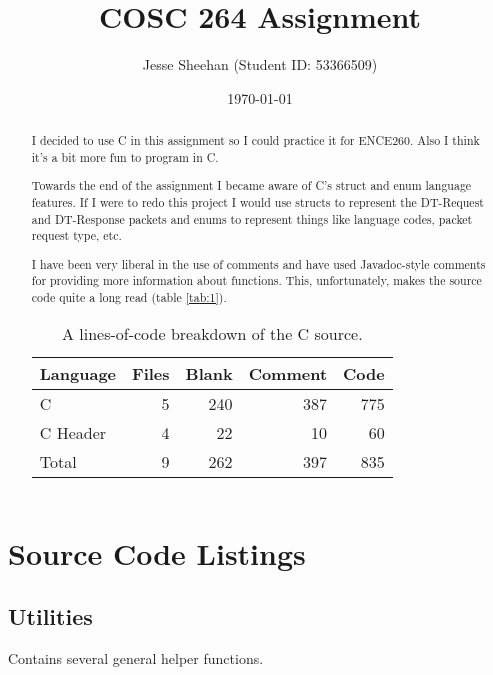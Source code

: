 \documentclass[11pt]{article} %
\title{COSC 264 Assignment}
\date{\today}
\author{Jesse Sheehan (Student ID: 53366509)}
\newcommand{\includecode}[2][c]{\begin{mdframed}\inputminted[linenos=true, breaklines]{#1}{#2}\end{mdframed}}
\begin{document}
\begin{titlepage}

\maketitle

\hrulefill

\begin{abstract}
I decided to use C in this assignment so I could practice it for ENCE260. Also I think it's a bit more fun to program in C.

Towards the end of the assignment I became aware of C's struct and enum language features. If I were to redo this project I would use structs to represent the DT-Request and DT-Response packets and enums to represent things like language codes, packet request type, etc.

I have been very liberal in the use of comments and have used Javadoc-style comments for providing more information about functions. This, unfortunately, makes the source code quite a long read (table \ref{tab:1}).

\begin{table}[H]
	\centering
  \begin{tabular}{ |l|r|r|r|r| }
	\hline
	Language & Files & Blank & Comment & Code \\ \hline
	C & 5 & 240 & 387 & 775 \\
	C Header & 4 & 22 & 10 & 60 \\ \hline \hline
	Total & 9 & 262 & 397 & 835 \\ \hline
  \end{tabular}
  \caption{A lines-of-code breakdown of the C source.}
  \label{tab:1}
\end{table}

\end{abstract}

\tableofcontents

\end{titlepage}
\setcounter{page}{2}


\section{Source Code Listings}

\subsection{Utilities}
Contains several general helper functions.
\includecode{../src/utils.h}
\includecode{../src/utils.c}
\end{document}
